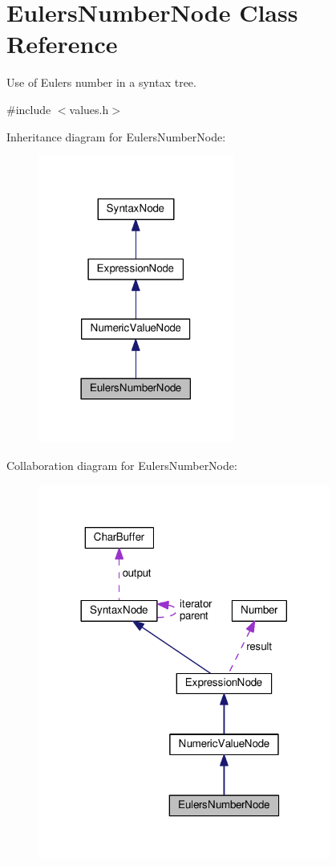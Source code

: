 \hypertarget{classEulersNumberNode}{}\section{Eulers\+Number\+Node Class Reference}
\label{classEulersNumberNode}


Use of Eulers number in a syntax tree.  




{\ttfamily \#include $<$values.\+h$>$}



Inheritance diagram for Eulers\+Number\+Node\+:\nopagebreak
\begin{figure}[H]
\begin{center}
\leavevmode
\includegraphics[width=182pt]{classEulersNumberNode__inherit__graph}
\end{center}
\end{figure}


Collaboration diagram for Eulers\+Number\+Node\+:\nopagebreak
\begin{figure}[H]
\begin{center}
\leavevmode
\includegraphics[width=272pt]{classEulersNumberNode__coll__graph}
\end{center}
\end{figure}
